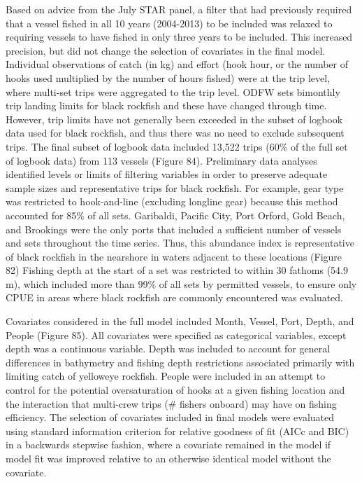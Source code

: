 \documentclass[11pt,
  english,
  letterpaper,
]{article}
\begin{document}
Based on advice from the July STAR panel, a filter that had previously required that a vessel fished in all 10 years (2004-2013) to be included was relaxed to requiring vessels to have fished in only three years to be included. This increased precision, but did not change the selection of covariates in the final model. Individual observations of catch (in kg) and effort (hook hour, or the number of hooks used multiplied by the number of hours fished) were at the trip level, where multi-set trips were aggregated to the trip level. ODFW sets bimonthly trip landing limits for black rockfish and these have changed through time. However, trip limits have not generally been exceeded in the subset of logbook data used for black rockfish, and thus there was no need to exclude subsequent trips. The final subset of logbook data included 13,522 trips (60\% of the full set of logbook data) from 113 vessels (Figure 84). Preliminary data analyses identified levels or limits of filtering variables in order to preserve adequate sample sizes and representative trips for black rockfish. For example, gear type was restricted to hook-and-line (excluding longline gear) because this method accounted for 85\% of all sets. Garibaldi, Pacific City, Port Orford, Gold Beach, and Brookings were the only ports that included a sufficient number of vessels and sets throughout the time series. Thus, this abundance index is representative of black rockfish in the nearshore in waters adjacent to these locations (Figure 82) Fishing depth at the start of a set was restricted to within 30 fathoms (54.9 m), which included more than 99\% of all sets by permitted vessels, to ensure only CPUE in areas where black rockfish are commonly encountered was evaluated.

Covariates considered in the full model included Month, Vessel, Port, Depth, and People (Figure 85). All covariates were specified as categorical variables, except depth was a continuous variable. Depth was included to account for general differences in bathymetry and fishing depth restrictions associated primarily with limiting catch of yelloweye rockfish. People were included in an attempt to control for the potential oversaturation of hooks at a given fishing location and the interaction that multi-crew trips (\# fishers onboard) may have on fishing efficiency. The selection of covariates included in final models were evaluated using standard information criterion for relative goodness of fit (AICc and BIC) in a backwards stepwise fashion, where a covariate remained in the model if model fit was improved relative to an otherwise identical model without the covariate.
\end{document}
